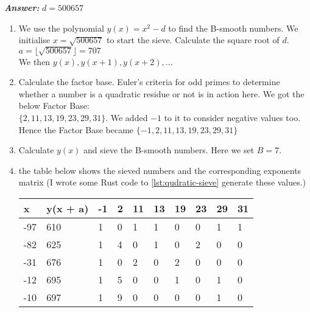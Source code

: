 \documentclass[11pt,a4paper,fleqn]{article}
\newcommand\Tstrut{\rule{0pt}{2.6ex}}         %
\begin{document}
\begin{enumerate}[1.]
		\begin{flushleft}
			\textbf{\textit{Answer:}} $d = 500657$\\
            \begin{enumerate}[Step 1.]
                \item We use the polynomial $y(x) = x^2 - d$ to find the B-smooth numbers. We initialise $x = \sqrt{500657}$ to start the sieve. Calculate the square root of $d$.\\
                $a = \lfloor\sqrt{500657}\rfloor = 707$\\
                We then $y(x), y(x + 1), y(x + 2), ...$
                \item Calculate the factor base. Euler's criteria for odd primes to determine whether a number is a quadratic residue or not is in action here. We got the below Factor Base: \\
                $\{2, 11, 13, 19, 23, 29, 31\}$. We added $-1$ to it to consider negative values too. Hence the Factor Base became $\{-1, 2, 11, 13, 19, 23, 29, 31\}$
                \item Calculate $y(x)$ and sieve the B-smooth numbers. Here we set $B = 7$.
                \item the table below shows the sieved numbers and the corresponding exponents matrix (I wrote some Rust code to \ref{lst:qudratic-sieve} generate these values.)
                \begin{table}[H]
                    \begin{adjustbox}{scale=1.2,center}
                        \begin{tabular}{ |l|l|l|l|l|l|l|l|l|l| }
                            \hline
                            \textbf{x} & \textbf{y(x + a)} & \textbf{-1} & \textbf{2} & \textbf{11} & \textbf{13} & \textbf{19} & \textbf{23} & \textbf{29} & \textbf{31} \Tstrut\\
                            \hline
                            -97 & 610 & 1 & 0 & 1 & 1 & 0 & 0 & 1 & 1\\ \hline
                            \rowcolor{SeaGreen3!30!}
                            -82 & 625 & 1 & 4 & 0 & 1 & 0 & 2 & 0 & 0\\ \hline
                            \rowcolor{SeaGreen3!30!}
                            -31 & 676 & 1 & 0 & 2 & 0 & 2 & 0 & 0 & 0\\ \hline
                            -12 & 695 & 1 & 5 & 0 & 0 & 1 & 0 & 1 & 0\\ \hline
                            -10 & 697 & 1 & 9 & 0 & 0 & 0 & 0 & 1 & 0\\ \hline

\end{tabular}
\end{adjustbox}
\end{table}
\end{enumerate}
\end{flushleft}
\end{enumerate}
\end{document}

